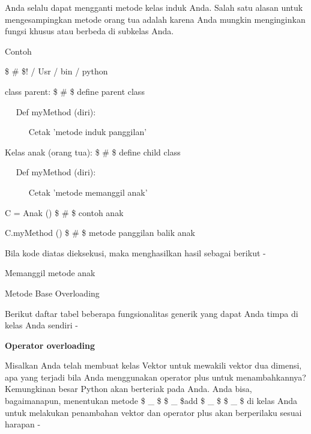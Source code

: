 \begin{12pt}
\begin{12pt}
\begin{12pt}
\begin{12pt}
\begin{12pt}
\begin{12pt}
\begin{12pt}
\begin{12pt}
\begin{12pt}
\begin{12pt}
\begin{12pt}
\begin{12pt}
\begin{12pt}
\begin{12pt}
\begin{12pt}
\begin{12pt}
\begin{12pt}
\begin{12pt}
\begin{12pt}
\vspace{12pt}
Anda selalu dapat mengganti metode kelas induk Anda. Salah satu alasan untuk mengesampingkan metode orang tua adalah karena Anda mungkin menginginkan fungsi khusus atau berbeda di subkelas Anda. \par
Contoh \par
\vspace{12pt}
\noindent 
 \$  \#  \$! / Usr / bin / python \par
\vspace{12pt}
\noindent 
class parent:  \$  \#  \$ define parent class \par
\noindent 
~~ Def myMethod (diri): \par
\noindent 
~~~~~ Cetak 'metode induk panggilan' \par
\vspace{12pt}
\noindent 
Kelas anak (orang tua):  \$  \#  \$ define child class \par
\noindent 
~~ Def myMethod (diri): \par
\noindent 
~~~~~ Cetak 'metode memanggil anak' \par
\vspace{12pt}
\noindent 
C = Anak ()  \$  \#  \$ contoh anak \par
\noindent 
C.myMethod ()  \$  \#  \$ metode panggilan balik anak \par
\vspace{12pt}
\noindent 
Bila kode diatas dieksekusi, maka menghasilkan hasil sebagai berikut - \par
\vspace{12pt}
\noindent 
Memanggil metode anak \par
\vspace{12pt}
\noindent 
Metode Base Overloading \par
\vspace{12pt}
\noindent 
Berikut daftar tabel beberapa fungsionalitas generik yang dapat Anda timpa di kelas Anda sendiri - \par
\vspace{14pt}
\noindent 
{\fontsize{14pt}{14pt}\selectfont \textbf{Operator overloading} \\} \par
\vspace{12pt}
Misalkan Anda telah membuat kelas Vektor untuk mewakili vektor dua dimensi, apa yang terjadi bila Anda menggunakan operator plus untuk menambahkannya? Kemungkinan besar Python akan berteriak pada Anda. Anda bisa, bagaimanapun, menentukan metode  \$  \_  \$ \$  \_  \$add \$  \_  \$ \$  \_  \$ di kelas Anda untuk melakukan penambahan vektor dan operator plus akan berperilaku sesuai harapan - \par

\end{12pt}
\end{12pt}
\end{12pt}
\end{12pt}
\end{12pt}
\end{12pt}
\end{12pt}
\end{12pt}
\end{12pt}
\end{12pt}
\end{12pt}
\end{12pt}
\end{12pt}
\end{12pt}
\end{12pt}
\end{12pt}
\end{12pt}
\end{12pt}
\end{12pt}
